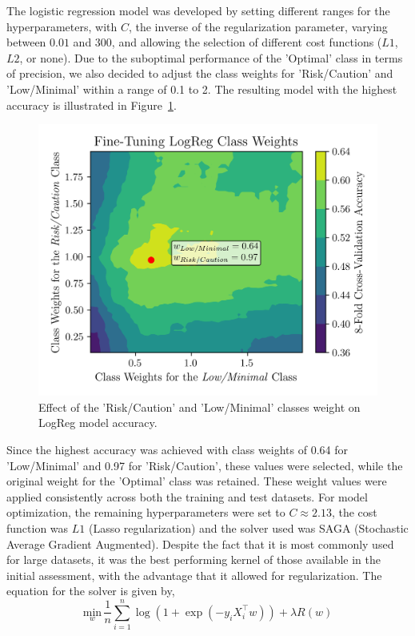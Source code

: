 \documentclass[conference]{IEEEtran}
\begin{document}
The logistic regression model was developed by setting different ranges for the hyperparameters, with $C$, the inverse of the regularization parameter, varying between $0.01$ and $300$, and allowing the selection of different cost functions ($L1$, $L2$, or none). Due to the suboptimal performance of the 'Optimal' class in terms of precision, we also decided to adjust the class weights for 'Risk/Caution' and 'Low/Minimal' within a range of 0.1 to 2. The resulting model with the highest accuracy is illustrated in Figure~\ref{logregWt}.

\begin{figure}[H]
    \centering
    \includegraphics[width=1\linewidth]{assets/LOGR_class_weights.png}
    \caption{Effect of the 'Risk/Caution' and 'Low/Minimal' classes weight on LogReg model accuracy.}
    \label{logregWt}
\end{figure} %

Since the highest accuracy was achieved with class weights of 0.64 for 'Low/Minimal' and 0.97 for 'Risk/Caution', these values were selected, while the original weight for the 'Optimal' class was retained. These weight values were applied consistently across both the training and test datasets. For model optimization, the remaining hyperparameters were set to $C \approx 2.13$, the cost function was $L1$ (Lasso regularization) and the solver used was SAGA (Stochastic Average Gradient Augmented). Despite the fact that it is most commonly used for large datasets, it was the best performing kernel of those available in the initial assessment, with the advantage that it allowed for regularization. The equation for the solver is given by,
\begin{equation}
\underset{w}{\text{min}} \, \frac{1}{n} \sum_{i=1}^{n} \log\left(1 + \exp\left(-y_i X_i^\top w\right)\right) + \lambda R(w)
\end{equation} %
\end{document}
